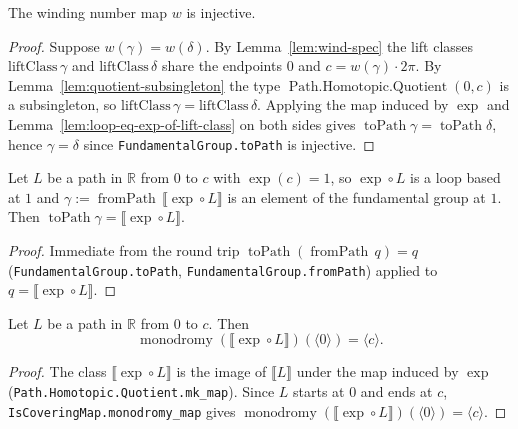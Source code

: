 \begin{lemma}
    \label{lem:wind-injective}
    \leanok
    The winding number map \(w\) is injective.
\end{lemma}
\begin{proof}
    Suppose \(w(\gamma) = w(\delta)\). By Lemma~\ref{lem:wind-spec} the lift classes
    \(\mathrm{liftClass}\,\gamma\) and \(\mathrm{liftClass}\,\delta\) share the endpoints \(0\) and
    \(c = w(\gamma)\cdot 2\pi\). By Lemma~\ref{lem:quotient-subsingleton} the type
    \(\operatorname{Path.Homotopic.Quotient}(0, c)\) is a subsingleton, so
    \(\mathrm{liftClass}\,\gamma = \mathrm{liftClass}\,\delta\). Applying the map induced by \(\exp\) and
    Lemma~\ref{lem:loop-eq-exp-of-lift-class} on both sides gives
    \(\operatorname{toPath}\gamma = \operatorname{toPath}\delta\), hence \(\gamma = \delta\) since
    \texttt{FundamentalGroup.toPath} is injective.
\end{proof}

\begin{lemma}
    \label{lem:exp-comp-topath}
    \leanok
    Let \(L\) be a path in \(\mathbb{R}\) from \(0\) to \(c\) with \(\exp(c) = 1\), so
    \(\exp \circ L\) is a loop based at \(1\) and
    \(\gamma := \operatorname{fromPath}\,\llbracket \exp\circ L\rrbracket\) is an element of the
    fundamental group at \(1\). Then \(\operatorname{toPath}\gamma = \llbracket \exp\circ L\rrbracket\).
\end{lemma}
\begin{proof}
    Immediate from the round trip \(\operatorname{toPath}(\operatorname{fromPath}\,q) = q\)
    (\texttt{FundamentalGroup.toPath}, \texttt{FundamentalGroup.fromPath}) applied to
    \(q = \llbracket \exp\circ L\rrbracket\).
\end{proof}

\begin{lemma}
    \label{lem:exp-comp-monodromy}
    \leanok
    Let \(L\) be a path in \(\mathbb{R}\) from \(0\) to \(c\). Then
    \[
      \operatorname{monodromy}(\llbracket \exp\circ L\rrbracket)(\langle 0\rangle) = \langle c\rangle .
    \]
\end{lemma}
\begin{proof}
    The class \(\llbracket \exp\circ L\rrbracket\) is the image of \(\llbracket L\rrbracket\) under the
    map induced by \(\exp\) (\texttt{Path.Homotopic.Quotient.mk\_map}). Since \(L\) starts at \(0\) and
    ends at \(c\), \texttt{IsCoveringMap.monodromy\_map} gives
    \(\operatorname{monodromy}(\llbracket \exp\circ L\rrbracket)(\langle 0\rangle) = \langle c\rangle\).
\end{proof}

